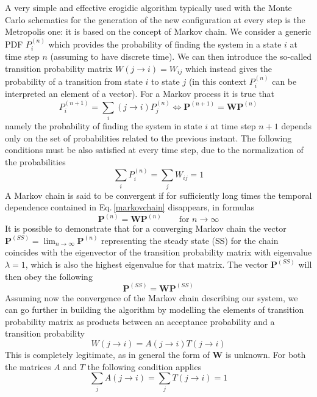 A very simple and effective erogidic algorithm typically used with the Monte Carlo schematics for the generation of the new configuration at every step is the Metropolis one: it is based on the concept of Markov chain. We consider a generic PDF $P_i^{(n)}$ which provides the probability of finding the system in a state $i$ at time step $n$ (assuming to have discrete time). We can then introduce the so-called transition probability matrix $W(j \rightarrow i) = W_{ij}$ which instead gives the probability of a transition from state $i$ to state $j$ (in this context $P_i^{(n)}$ can be interpreted an element of a vector). For a Markov process it is true that
\begin{equation}
    P_i^{(n+1)} = \sum_{i} ( j \rightarrow i) P_j^{(n)} \iff \bm{P}^{(n+1)} = \bm{W} \bm{P}^{(n)}
    \label{markovchain}
\end{equation}
namely the probability of finding the system in state $i$ at time step $n+1$ depends only on the set of probabilities related to the previous instant. The following conditions must be also satisfied at every time step, due to the normalization of the probabilities
\begin{equation*}
    \sum_i P_i^{(n)} = \sum_j W_{ij} = 1
\end{equation*}
A Markov chain is said to be convergent if for sufficiently long times the temporal dependence contained in Eq.\,\ref{markovchain} disappears, in formulas
\begin{equation*}
     \bm{P}^{(n)} = \bm{W} \bm{P}^{(n)} \qquad \mbox{for } n \rightarrow \infty
\end{equation*}
It is possible to demonstrate that for a converging Markov chain the vector $\bm{P}^{(SS)} = \lim_{n\rightarrow \infty} \bm{P}^{(n)}$ representing the steady state (SS) for the chain coincides with the eigenvector of the transition probability matrix with eigenvalue $\lambda = 1$, which is also the highest eigenvalue for that matrix. The vector $\bm{P}^{(SS)}$ will then obey the following
\begin{equation}
    \bm{P}^{(SS)} = \bm{W} \bm{P}^{(SS)}
    \label{convergence_markov_chain}
\end{equation}
Assuming now the convergence of the Markov chain describing our system, we can go further in building the algorithm by modelling the elements of transition probability matrix as products between an acceptance probability and a transition probability
\begin{equation*}
    W(j\rightarrow i) = A(j\rightarrow i) T(j\rightarrow i)
\end{equation*}
This is completely legitimate, as in general the form of $\bm{W}$ is unknown. For both the matrices $A$ and $T$ the following condition applies
\begin{equation*}
    \sum_j A(j\rightarrow i) = \sum_j T(j\rightarrow i) = 1
\end{equation*}


